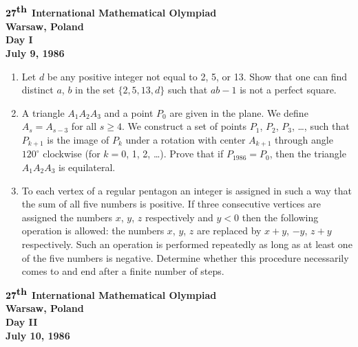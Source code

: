\documentclass[12pt]{article}
\begin{document}
\begin{center}
${\bf 27}^{\mbox{\bf th}}$ {\bf International
Mathematical Olympiad} \\[.1in]
{\bf Warsaw, Poland} \\ [.05in]
{\bf Day I}\\[.05in]
{\bf July 9, 1986}
\end{center}

\vspace*{.3in}

\begin{enumerate}
\item
Let $d$ be any positive integer not equal to 2, 5, or 13.  Show that one can
find distinct $a$, $b$ in the set $\{2,5,13,d\}$ such that $ab - 1$ is not a
perfect square.

\item
A triangle $A_1 A_2 A_3$ and a point $P_0$ are given in the plane.  We define
$A_s = A_{s-3}$ for all $s \geq 4$.  We construct a set of points $P_1$, $P_2$,
$P_3$, \ldots, such that $P_{k+1}$ is the image of $P_k$ under a rotation with
center $A_{k+1}$ through angle $120^\circ$ clockwise (for $k = 0$, 1, 2,
\ldots).  Prove that if $P_{1986} = P_0$, then the triangle $A_1 A_2 A_3$ is
equilateral.

\item
To each vertex of a regular pentagon an integer is assigned in such a way that
the sum of all five numbers is positive.  If three consecutive vertices are
assigned the numbers $x$, $y$, $z$ respectively and $y < 0$ then the following
operation is allowed: the numbers $x$, $y$, $z$ are replaced by $x + y$, $-y$,
$z + y$ respectively.  Such an operation is performed repeatedly as long as at
least one of the five numbers is negative.  Determine whether this procedure
necessarily comes to and end after a finite number of steps.
\end{enumerate}

\pagebreak %
\begin{center}
${\bf 27}^{\mbox{\bf th}}$ {\bf International
Mathematical Olympiad} \\[.1in]
{\bf Warsaw, Poland} \\ [.05in]
{\bf Day II}\\[.05in]
{\bf July 10, 1986}
\end{center}

\vspace*{.3in}
\end{document}
